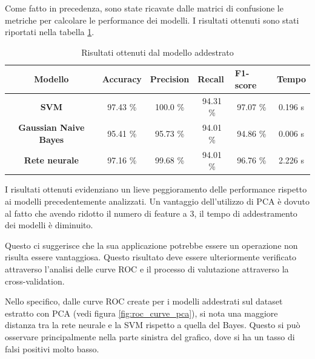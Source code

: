 Come fatto in precedenza, sono state ricavate dalle matrici di confusione le
metriche per calcolare le performance dei modelli. I risultati ottenuti sono stati
riportati nella tabella \ref{tab:risultati_pca}.
\begin{table}[!ht]
    \centering
    \begin{tabular}{@{}clllll@{}}
        \toprule
        \rowcolor[HTML]{EFEFEF}
        \textbf{Modello}                                      & \textbf{Accuracy}            & \textbf{Precision}           & \textbf{Recall}              & \textbf{F1-score}            & \textbf{Tempo}              \\ \midrule
        \cellcolor[HTML]{EFEFEF}\textbf{SVM}                  & \multicolumn{1}{c}{97.43 \%} & \multicolumn{1}{c}{100.0 \%} & \multicolumn{1}{c}{94.31 \%} & \multicolumn{1}{c}{97.07 \%} & \multicolumn{1}{c}{0.196 s} \\
        \cellcolor[HTML]{EFEFEF}\textbf{Gaussian Naive Bayes} & \multicolumn{1}{c}{95.41 \%} & \multicolumn{1}{c}{95.73 \%} & \multicolumn{1}{c}{94.01 \%} & \multicolumn{1}{c}{94.86 \%} & \multicolumn{1}{c}{0.006 s} \\
        \cellcolor[HTML]{EFEFEF}\textbf{Rete neurale}         & \multicolumn{1}{c}{97.16 \%} & \multicolumn{1}{c}{99.68 \%} & \multicolumn{1}{c}{94.01 \%} & \multicolumn{1}{c}{96.76 \%} & \multicolumn{1}{c}{2.226 s} \\ \bottomrule
    \end{tabular}
    \caption{Risultati ottenuti dal modello addestrato}
    \label{tab:risultati_pca}
\end{table}

I risultati ottenuti evidenziano un lieve peggioramento delle performance
rispetto ai modelli precedentemente analizzati. Un vantaggio dell'utilizzo di
PCA è dovuto al fatto che avendo ridotto il numero di feature a $3$, il tempo di
addestramento dei modelli è diminuito.

Questo ci suggerisce che la sua applicazione potrebbe essere un operazione
non risulta essere vantaggiosa. Questo risultato deve essere ulteriormente
verificato attraverso l'analisi delle curve ROC e il processo di valutazione
attraverso la cross-validation.

Nello specifico, dalle curve ROC create per i modelli addestrati sul dataset
estratto con PCA (vedi figura \ref{fig:roc_curve_pca}), si nota una maggiore
distanza tra la rete neurale e la SVM rispetto a quella del Bayes.
Questo si può osservare principalmente nella parte sinistra del grafico, dove si
ha un tasso di falsi positivi molto basso.

